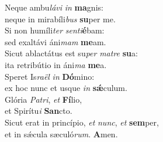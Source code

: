 \evenverse Neque ambu\textit{lá}\textit{vi} \textit{in} \textbf{ma}gnis:~\*\\
\evenverse neque in mirabíli\textit{bus} \textbf{su}per me.\\
\oddverse Si non humíli\textit{ter} \textit{sen}\textit{ti}\textbf{é}bam:~\*\\
\oddverse sed exaltávi áni\textit{mam} \textbf{me}am.\\
\evenverse Sicut ablactátus est su\textit{per} \textit{ma}\textit{tre} \textbf{su}a:~\*\\
\evenverse ita retribútio in áni\textit{ma} \textbf{me}a.\\
\oddverse Speret Is\textit{ra}\textit{ël} \textit{in} \textbf{Dó}mino:~\*\\
\oddverse ex hoc nunc et usque \textit{in} \textbf{sǽ}culum.\\
\evenverse Glória \textit{Pa}\textit{tri}, \textit{et} \textbf{Fí}lio,~\*\\
\evenverse et Spirítu\textit{i} \textbf{San}cto.\\
\oddverse Sicut erat in princípio, \textit{et} \textit{nunc}, \textit{et} \textbf{sem}per,~\*\\
\oddverse et in sǽcula sæculó\textit{rum}. \textbf{A}men.\\
